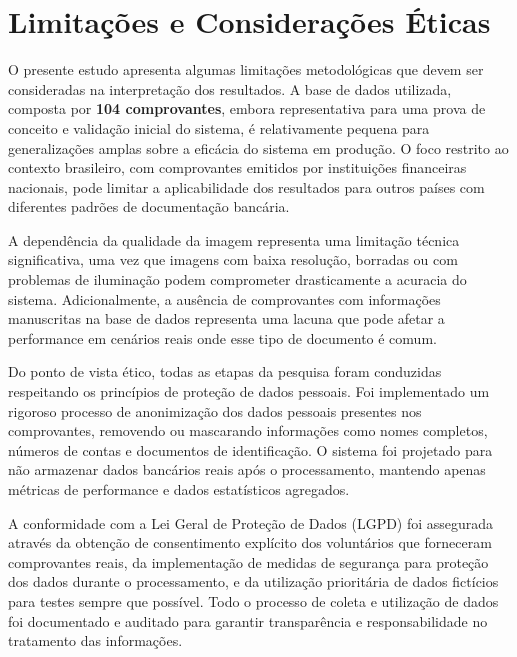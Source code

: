 \section{Limitações e Considerações Éticas}

O presente estudo apresenta algumas limitações metodológicas que devem ser consideradas na interpretação dos resultados. A base de dados utilizada, composta por \textbf{104 comprovantes}, embora representativa para uma prova de conceito e validação inicial do sistema, é relativamente pequena para generalizações amplas sobre a eficácia do sistema em produção. O foco restrito ao contexto brasileiro, com comprovantes emitidos por instituições financeiras nacionais, pode limitar a aplicabilidade dos resultados para outros países com diferentes padrões de documentação bancária.

A dependência da qualidade da imagem representa uma limitação técnica significativa, uma vez que imagens com baixa resolução, borradas ou com problemas de iluminação podem comprometer drasticamente a acuracia do sistema. Adicionalmente, a ausência de comprovantes com informações manuscritas na base de dados representa uma lacuna que pode afetar a performance em cenários reais onde esse tipo de documento é comum.

Do ponto de vista ético, todas as etapas da pesquisa foram conduzidas respeitando os princípios de proteção de dados pessoais. Foi implementado um rigoroso processo de anonimização dos dados pessoais presentes nos comprovantes, removendo ou mascarando informações como nomes completos, números de contas e documentos de identificação. O sistema foi projetado para não armazenar dados bancários reais após o processamento, mantendo apenas métricas de performance e dados estatísticos agregados.

A conformidade com a Lei Geral de Proteção de Dados (LGPD) foi assegurada através da obtenção de consentimento explícito dos voluntários que forneceram comprovantes reais, da implementação de medidas de segurança para proteção dos dados durante o processamento, e da utilização prioritária de dados fictícios para testes sempre que possível. Todo o processo de coleta e utilização de dados foi documentado e auditado para garantir transparência e responsabilidade no tratamento das informações.